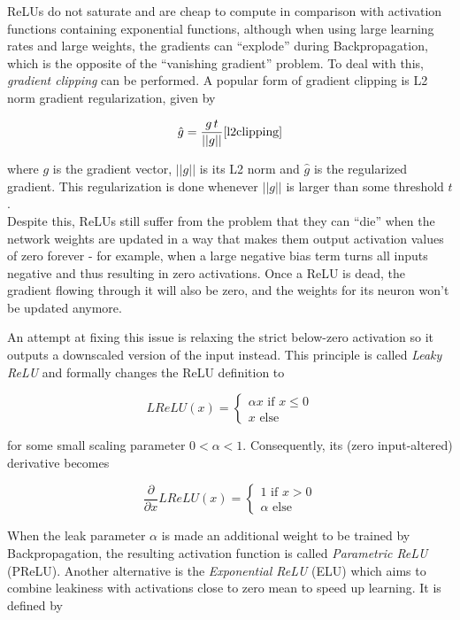 ReLUs do not saturate and are cheap to compute in comparison with activation functions containing exponential functions, although when using large learning rates and large weights, the gradients can ``explode'' during Backpropagation, which is the opposite of the ``vanishing gradient'' problem. To deal with this, \textit{gradient clipping} can be performed. A popular form of gradient clipping is L2 norm gradient regularization, given by

\[ \hat{g} = \frac{g\,t}{||g||} \cite{l2clipping} \]

\noindent where $g$ is the gradient vector, $||g||$ is its L2 norm and $\hat{g}$ is the regularized gradient. This regularization is done whenever $||g||$ is larger than some threshold $t$.\\

\noindent Despite this, ReLUs still suffer from the problem that they can ``die'' when the network weights are updated in a way that makes them output activation values of zero forever - for example, when a large negative bias term turns all inputs negative and thus resulting in zero activations. Once a ReLU is dead, the gradient flowing through it will also be zero, and the weights for its neuron won't be updated anymore.

An attempt at fixing this issue is relaxing the strict below-zero activation so it outputs a downscaled version of the input instead. This principle is called \textit{Leaky ReLU} \cite{lrelu} and formally changes the ReLU definition to 

\[  LReLU(x) = \begin{cases}
			\alpha x \text{ if } x \leq 0\\
			x \text{ else}
		 \end{cases}
\]

\noindent for some small scaling parameter $0 < \alpha < 1$. Consequently, its (zero input-altered) derivative becomes

\[ \frac{\partial}{\partial x} LReLU(x) = \begin{cases}
							1 \text { if } x > 0\\
							\alpha \text{ else}
						        \end{cases}
\]

\noindent When the leak parameter $\alpha$ is made an additional weight to be trained by Backpropagation, the resulting activation function is called \textit{Parametric ReLU} (PReLU). Another alternative is the \textit{Exponential ReLU} (ELU) \cite{elu} which aims to combine leakiness with activations close to zero mean to speed up learning. It is defined by

